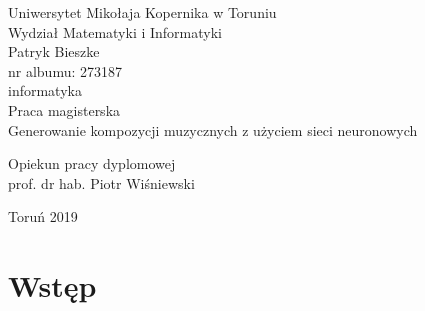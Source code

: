 \documentclass[12pt,a4paper,twoside]{mwart}
\begin{document}
\begin{titlepage}
	\begin{center}
		\large Uniwersytet Mikołaja Kopernika w Toruniu\\
		\large Wydział Matematyki i Informatyki\\
		\vspace{3cm} 
		\large Patryk Bieszke\\
			nr albumu: 273187\\
			informatyka\\
		\vspace{2cm}
		Praca magisterska\\
	
		\vspace{2cm} 
		\huge Generowanie kompozycji muzycznych z użyciem sieci neuronowych\\
	\end{center}
	\hfill
	\begin{minipage}{6cm}
		\vspace{2cm}
		Opiekun pracy dyplomowej\\
		prof. dr hab. Piotr Wiśniewski
	\end{minipage}
	\vspace{3cm}
	\begin{center}
		Toruń 2019\\
	\end{center}
\end{titlepage}



\clearpage
\thispagestyle{empty}
\mbox{}

\tableofcontents 
\clearpage

\setcounter{secnumdepth}{0}
\section{Wstęp}
\label{sec:wstep}

\newpage
\end{document}
